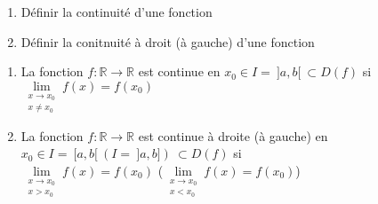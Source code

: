 \documentclass[12pt]{article}
\newcommand*{\xfield}[1]{\begin{mdframed}\centering #1\end{mdframed}\bigskip}
\newenvironment{note}{}{}
\begin{document}
\begin{note}
	\xfield{\begin{enumerate}
		\item Définir la continuité d'une fonction
		\item Définir la conitnuité à droit (à gauche) d'une fonction
	\end{enumerate} }
	\xfield{\begin{enumerate}
		\item La fonction $f:\mathbb{R}\to \mathbb{R}$ est continue en $x_0 \in I =\ ]a,b[\ \subset D(f)$ si $\lim\limits_{\substack{x\to x_0\\x \neq x_0}}f(x) = f(x_0)$
		\item La fonction $f:\mathbb{R}\to \mathbb{R}$ est continue à droite (à gauche) en $x_0 \in I =\ [a,b[\ (I =\ ]a,b])\ \subset D(f)$ si\\
		 $\lim\limits_{\substack{x\to x_0\\x > x_0}}f(x) = f(x_0)$ ($\lim\limits_{\substack{x\to x_0\\x < x_0}}f(x) = f(x_0)$)
	\end{enumerate} }
\end{note}
\end{document}
